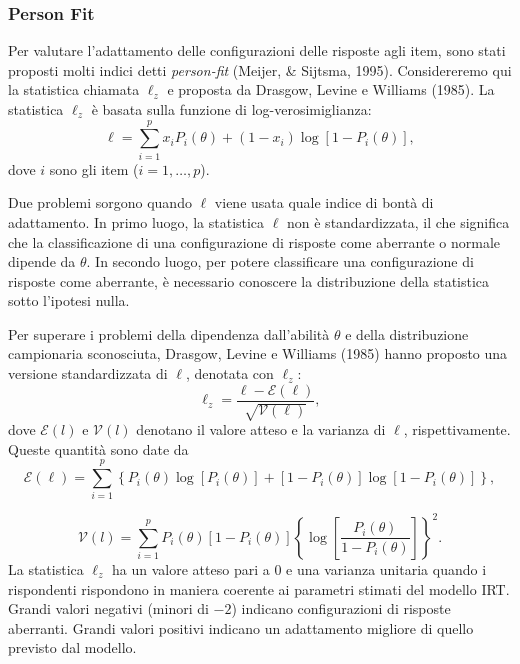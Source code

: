 \subsubsection{Person Fit}

Per valutare l'adattamento delle configurazioni delle risposte agli item, sono stati proposti molti indici detti {\it person-fit} (Meijer, \& Sijtsma, 1995). Considereremo qui la statistica chiamata $\ell_z$ e proposta da Drasgow, Levine e Williams (1985).  La statistica  $\ell_z$ è basata sulla funzione di log-verosimiglianza:
\begin{equation}
\ell = \sum_{i=1}^p x_i P_i(\theta) + (1- x_i)\log[1-P_i(\theta)],
\end{equation}
dove $i$ sono gli item ($i=1,\dots, p$). 

Due problemi sorgono quando $\ell$ viene usata quale indice di bontà di adattamento.  In primo luogo, la statistica $\ell$ non è standardizzata, il che significa che la classificazione di una configurazione di risposte come aberrante o normale dipende da $\theta$. In secondo luogo, per potere classificare una configurazione di risposte come aberrante, è necessario conoscere la distribuzione della statistica sotto l'ipotesi nulla.  

Per superare i problemi della dipendenza dall'abilità $\theta$ e della distribuzione campionaria sconosciuta, Drasgow, Levine e Williams (1985) hanno proposto una versione standardizzata di $\ell$, denotata con $\ell_z$:
\begin{equation}
\ell_z = \frac{\ell - \mathscr{E}(\ell)}{\sqrt{\mathscr{V}(\ell)}},
\end{equation}
\noindent dove $\mathscr{E}(l)$ e $\mathscr{V}(l)$ denotano il valore atteso e la varianza di $\ell$, rispettivamente. Queste quantità sono date da
\begin{equation}
\mathscr{E}(\ell) = \sum_{i=1}^p \left\{P_i(\theta) \log [ P_i(\theta) ] + [1-P_i(\theta)] \log[1-P_i(\theta)]  \right\},
\end{equation}

\begin{equation}
\mathscr{V}(l) = \sum_{i=1}^p P_i(\theta)  [1-P_i(\theta)] \left\{ \log \left[ \frac{ P_i(\theta)  }{1 -P_i(\theta)  } \right] \right\}^2.
\end{equation}
La statistica $\ell_z$ ha un valore atteso pari a $0$ e una varianza unitaria quando i rispondenti rispondono in maniera coerente ai parametri stimati del modello IRT. Grandi valori negativi (minori di $-2$) indicano configurazioni di risposte aberranti.  Grandi valori positivi indicano un adattamento migliore di quello previsto dal modello. 

